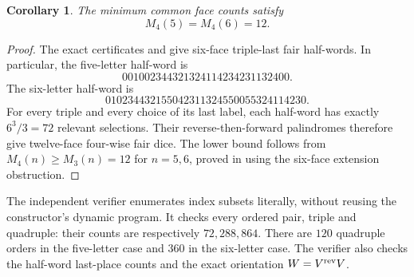 \documentclass[11pt]{article}
\newtheorem{corollary}{Corollary}
\begin{document}
\begin{corollary}
The minimum common face counts satisfy
\[
 M_4(5)=M_4(6)=12.
\]
\end{corollary}
\begin{proof}
The exact certificates
 and
give six-face triple-last fair half-words. In particular, the
five-letter half-word is
\[
 001002344321324114234231132400.
\]
The six-letter half-word is
\[
 010234432155042311324550055324114230.
\]
For every triple and every choice of its last label, each half-word
has exactly $6^3/3=72$ relevant selections. Their reverse-then-forward
palindromes therefore give twelve-face four-wise fair dice.
The lower bound follows from $M_4(n)\ge M_3(n)=12$ for $n=5,6$,
proved in  using the six-face
extension obstruction.
\end{proof}

The independent verifier 
enumerates index subsets literally, without reusing the constructor's
dynamic program. It checks every ordered pair, triple and quadruple:
their counts are respectively $72,288,864$. There are $120$ quadruple
orders in the five-letter case and $360$ in the six-letter case.
The verifier also checks the half-word last-place counts and the
exact orientation $W=V^{\rm rev}V$.
\end{document}

